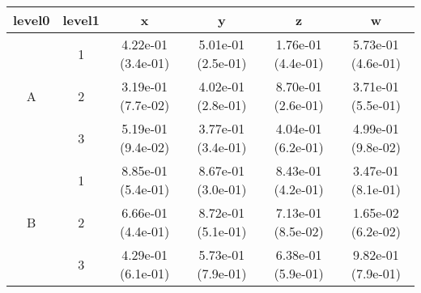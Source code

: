 \begin{tabular}{cccccc}
\toprule
level0 & level1&x&y&z&w\tabularnewline
\midrule
\multirow{3}{*}{A}&1& 4.22e-01 (3.4e-01)& 5.01e-01 (2.5e-01)& 1.76e-01 (4.4e-01)& 5.73e-01 (4.6e-01)\tabularnewline
&2& 3.19e-01 (7.7e-02)& 4.02e-01 (2.8e-01)& 8.70e-01 (2.6e-01)& 3.71e-01 (5.5e-01)\tabularnewline
&3& 5.19e-01 (9.4e-02)& 3.77e-01 (3.4e-01)& 4.04e-01 (6.2e-01)& 4.99e-01 (9.8e-02)\tabularnewline
\midrule
\multirow{3}{*}{B}&1& 8.85e-01 (5.4e-01)& 8.67e-01 (3.0e-01)& 8.43e-01 (4.2e-01)& 3.47e-01 (8.1e-01)\tabularnewline
&2& 6.66e-01 (4.4e-01)& 8.72e-01 (5.1e-01)& 7.13e-01 (8.5e-02)& 1.65e-02 (6.2e-02)\tabularnewline
&3& 4.29e-01 (6.1e-01)& 5.73e-01 (7.9e-01)& 6.38e-01 (5.9e-01)& 9.82e-01 (7.9e-01)\tabularnewline
\bottomrule
\end{tabular}
